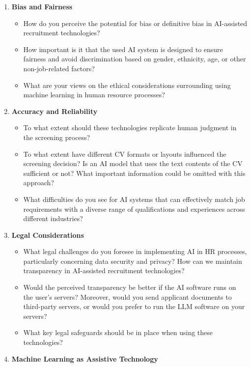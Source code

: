 \documentclass[draft,final]{thesisclass} %
\begin{document}
\begin{enumerate}
    \item \textbf{Bias and Fairness}
    \begin{itemize}
        \item How do you perceive the potential for bias or definitive bias in \acs{AI}-assisted recruitment technologies?
        \item How important is it that the used \acs{AI} system is designed to ensure fairness and avoid discrimination based on gender, ethnicity, age, or other non-job-related factors?
        \item What are your views on the ethical considerations surrounding using machine learning in human resource processes?
    \end{itemize}
    \item \textbf{Accuracy and Reliability}
    \begin{itemize}
        \item To what extent should these technologies replicate human judgment in the screening process?
        \item To what extent have different \acs{CV} formats or layouts influenced the screening decision? Is an \acs{AI} model that uses the text contents of the \acs{CV} sufficient or not? What important information could be omitted with this approach?
        \item What difficulties do you see for \acs{AI} systems that can effectively match job requirements with a diverse range of qualifications and experiences across different industries?
    \end{itemize}
    \item \textbf{Legal Considerations}
    \begin{itemize}
        \item What legal challenges do you foresee in implementing \acs{AI} in \acs{HR} processes, particularly concerning data security and privacy? How can we maintain transparency in \acs{AI}-assisted recruitment technologies? 
        \item Would the perceived transparency be better if the \acs{AI} software runs on the user's servers? Moreover, would you send applicant documents to third-party servers, or would you prefer to run the \acs{LLM} software on your servers?
        \item What key legal safeguards should be in place when using these technologies?
    \end{itemize}
    \item \textbf{Machine Learning as Assistive Technology}

\end{enumerate}
\end{document}
